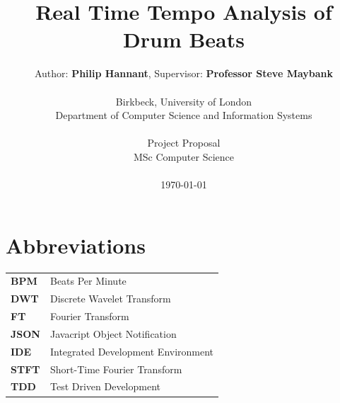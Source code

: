 \documentclass[a4paper, 11pt]{article}
\date{}
\begin{document}
 

\LARGE\title{Real Time Tempo Analysis of Drum Beats}

\LARGE\author{Author: \textbf{Philip Hannant}, Supervisor: \textbf{Professor Steve Maybank}\\
\\Birkbeck, University of London\\
Department of Computer Science and Information Systems\\
\\Project Proposal\\
MSc Computer Science\\
\\\monthyeardate\today
}





\normalsize


\maketitle
\newpage
\tableofcontents
\clearpage

\section*{Abbreviations}
\begin{tabular}{l p{4.5in}  }\\
\textbf{BPM} & Beats Per Minute\\
\textbf{DWT} & Discrete Wavelet Transform\\
\textbf{FT} & Fourier Transform\\
\textbf{JSON} & Javacript Object Notification\\
\textbf{IDE} & Integrated Development Environment\\
\textbf{STFT} & Short-Time Fourier Transform\\
\textbf{TDD} & Test Driven Development\\
\end{tabular}
\end{document}
